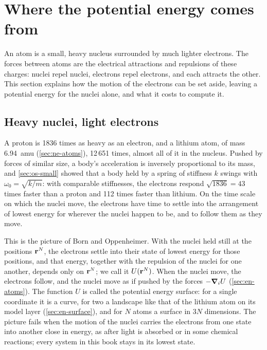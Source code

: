 \section{Where the potential energy comes from}
\label{sec:pe-origin}

An atom is a small, heavy nucleus surrounded by much lighter electrons.
The forces between atoms are the electrical attractions and repulsions of
these charges: nuclei repel nuclei, electrons repel electrons, and each
attracts the other. This section explains how the motion of the electrons
can be set aside, leaving a potential energy for the nuclei alone, and
what it costs to compute it.

\subsection*{Heavy nuclei, light electrons}

A proton is 1836 times as heavy as an electron, and a lithium atom, of
mass \SI{6.94}{amu} (\cref{sec:ne-atoms}), 12\,651 times, almost all of
it in the nucleus. Pushed by forces of similar size, a body's acceleration is
inversely proportional to its mass, and \cref{sec:os-small} showed that a
body held by a spring of stiffness $k$ swings with $\omega_0 =
\sqrt{k/m}$: with comparable stiffnesses, the electrons respond
$\sqrt{1836} = 43$ times faster than a proton and 112 times faster than
lithium. On the time scale on which the nuclei move, the electrons
have time to settle into the arrangement of lowest energy for wherever
the nuclei happen to be, and to follow them as they move.

This is the picture of Born and Oppenheimer\cite{BornOppenheimer1927}.
With the nuclei held still at the positions $\bm{\mathrm{r}}^N$, the electrons
settle into their state of lowest energy for those positions, and that
energy, together with the repulsion of the nuclei for one another,
depends only on $\bm{\mathrm{r}}^N$; we call it $U(\bm{\mathrm{r}}^N)$. When the nuclei move, the electrons
follow, and the nuclei move as if pushed by the forces $-\bm{\nabla}_iU$
(\cref{sec:en-atoms}). The function $U$ is called the potential energy
surface: for a single coordinate it is a curve, for two a landscape like
that of the lithium atom on its model layer (\cref{sec:en-surface}), and
for $N$ atoms a surface in $3N$ dimensions. The picture fails when the
motion of the nuclei carries the electrons from one state into another
close in energy, as after light is absorbed or in some chemical
reactions; every system in this book stays in its lowest state.

